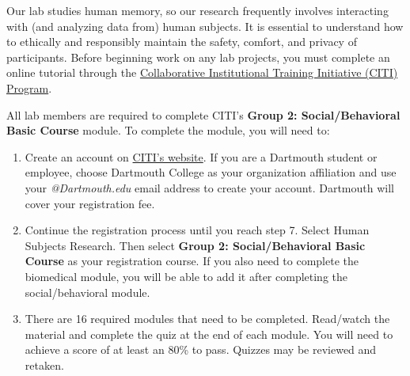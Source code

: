 \documentclass{tufte-book} %
\begin{document}

\noindent Our lab studies human memory,
so our research frequently involves interacting with (and
analyzing data from) human subjects. It is essential to
understand how to ethically and responsibly maintain the safety,
comfort, and privacy of participants. Before beginning work on any lab projects, you must
complete an online tutorial through the
\href{https://about.citiprogram.org}{Collaborative Institutional
  Training Initiative (CITI) Program}.

\noindent All lab members are required to complete CITI's
\textbf{Group 2: Social/Behavioral Basic Course} module.  To complete
the module, you will need to:
\begin{enumerate}
\item Create an account on \href{https://about.citiprogram.org}{CITI's
    website}.  If you are a Dartmouth student or employee, choose
  Dartmouth College as your organization affiliation and use your
  \textit{@Dartmouth.edu} email address to create your account.
  Dartmouth will cover your registration fee.
\item Continue the registration process until you reach step 7. Select
  Human Subjects Research. Then select \textbf{Group 2:
    Social/Behavioral Basic Course} as your registration course.  If
  you also need to complete the biomedical module, you will be able to
  add it after completing the social/behavioral module.
\item There are 16 required modules that need to be
  completed. Read/watch the material and complete the quiz at the
  end of each module. You will need to achieve a score of at least an
  80\% to pass. Quizzes may be reviewed and retaken.
\end{enumerate}
\end{document}
